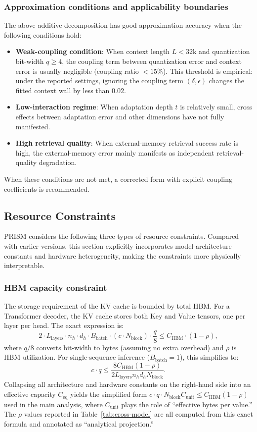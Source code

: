 \documentclass[11pt,a4paper]{article}
\theoremstyle{plain}
\theoremstyle{definition}
\begin{document}
\subsubsection*{Approximation conditions and applicability boundaries}

The above additive decomposition has good approximation accuracy when the following conditions hold:
\begin{itemize}
    \item \textbf{Weak-coupling condition}: When context length $L < 32\text{k}$ and quantization bit-width $q \geq 4$, the coupling term between quantization error and context error is usually negligible (coupling ratio $< 15\%$). This threshold is empirical: under the reported settings, ignoring the coupling term $(\delta, \epsilon)$ changes the fitted context wall by less than 0.02.
    \item \textbf{Low-interaction regime}: When adaptation depth $t$ is relatively small, cross effects between adaptation error and other dimensions have not fully manifested.
    \item \textbf{High retrieval quality}: When external-memory retrieval success rate is high, the external-memory error mainly manifests as independent retrieval-quality degradation.
\end{itemize}
When these conditions are not met, a corrected form with explicit coupling coefficients is recommended.

\subsection{Resource Constraints}

PRISM considers the following three types of resource constraints. Compared with earlier versions, this section explicitly incorporates model-architecture constants and hardware heterogeneity, making the constraints more physically interpretable.

\subsubsection*{HBM capacity constraint}
The storage requirement of the KV cache is bounded by total HBM. For a Transformer decoder, the KV cache stores both Key and Value tensors, one per layer per head. The exact expression is:
\[
2 \cdot L_{\text{layers}} \cdot n_h \cdot d_h \cdot B_{\text{batch}} \cdot (c \cdot N_{\text{block}}) \cdot \frac{q}{8} \leq C_{\text{HBM}} \cdot (1 - \rho),
\]
where $q/8$ converts bit-width to bytes (assuming no extra overhead) and $\rho$ is HBM utilization. For single-sequence inference ($B_{\text{batch}} = 1$), this simplifies to:
\[
c \cdot q \leq \frac{8 C_{\text{HBM}} (1-\rho)}{2 L_{\text{layers}} n_h d_h N_{\text{block}}}.
\]
Collapsing all architecture and hardware constants on the right-hand side into an effective capacity $C_{\text{eq}}$ yields the simplified form $c \cdot q \cdot N_{\text{block}} C_{\text{unit}} \leq C_{\text{HBM}}(1-\rho)$ used in the main analysis, where $C_{\text{unit}}$ plays the role of ``effective bytes per value.'' The $\rho$ values reported in Table~\ref{tab:cross-model} are all computed from this exact formula and annotated as ``analytical projection.''
\end{document}

